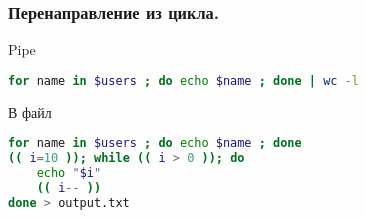 \begin{frame}[fragile]
\frametitle{Перенаправление из цикла.}
  \begin{block}{Pipe}
    \begin{lstlisting}[language=sh,frame=single]
for name in $users ; do echo $name ; done | wc -l
\end{lstlisting}
  \end{block}
  \begin{block}{В файл}
    \begin{lstlisting}[language=sh,frame=single]
for name in $users ; do echo $name ; done
(( i=10 )); while (( i > 0 )); do 
    echo "$i"
    (( i-- ))
done > output.txt
\end{lstlisting}
  \end{block}
\end{frame}
